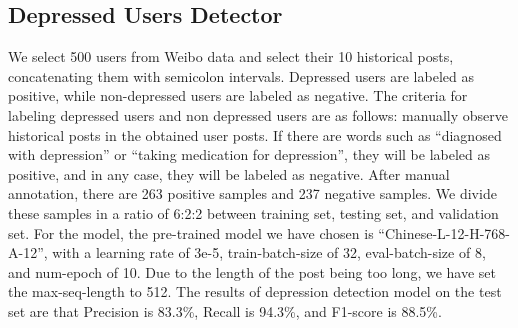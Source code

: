 \subsection{Depressed Users Detector}
\label{apd:dd_details}
We select 500 users from Weibo data and select their 10 historical posts, concatenating them with semicolon intervals. Depressed users are labeled as positive, while non-depressed users are labeled as negative. The criteria for labeling depressed users and non depressed users are as follows: manually observe historical posts in the obtained user posts. If there are words such as ``diagnosed with depression'' or ``taking medication for depression'', they will be labeled as positive, and in any case, they will be labeled as negative.
After manual annotation, there are 263 positive samples and 237 negative samples. We divide these samples in a ratio of 6:2:2 between training set, testing set, and validation set. For the model, the pre-trained model we have chosen is ``Chinese-L-12-H-768-A-12'', with a learning rate of 3e-5, train-batch-size of 32, eval-batch-size of 8, and num-epoch of 10. Due to the length of the post being too long, we have set the max-seq-length to 512. The results of depression detection model on the test set are that Precision is 83.3\%, Recall is 94.3\%, and F1-score is 88.5\%.


